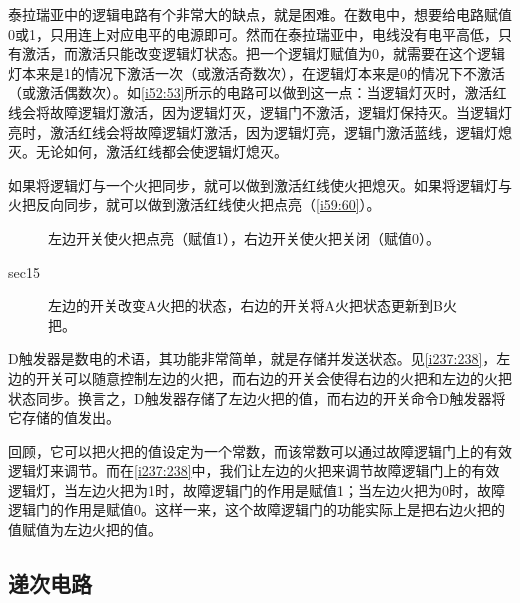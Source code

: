 泰拉瑞亚中的逻辑电路有个非常大的缺点，就是困难。在数电中，想要给电路赋值0或1，只用连上对应电平的电源即可。然而在泰拉瑞亚中，电线没有电平高低，只有激活，而激活只能改变逻辑灯状态。把一个逻辑灯赋值为0，就需要在这个逻辑灯本来是1的情况下激活一次（或激活奇数次），在逻辑灯本来是0的情况下不激活（或激活偶数次）。如\autoref{i52:53}所示的电路可以做到这一点：当逻辑灯灭时，激活红线会将故障逻辑灯激活，因为逻辑灯灭，逻辑门不激活，逻辑灯保持灭。当逻辑灯亮时，激活红线会将故障逻辑灯激活，因为逻辑灯亮，逻辑门激活蓝线，逻辑灯熄灭。无论如何，激活红线都会使逻辑灯熄灭。

\begin{figure}[!ht]
\centering
{}%
%
\caption{}
\label{i52:53}
\end{figure}

如果将逻辑灯与一个火把同步，就可以做到激活红线使火把熄灭。如果将逻辑灯与火把反向同步，就可以做到激活红线使火把点亮（\autoref{i59:60}）。

\begin{figure}[!ht]
\centering
{}%
%
\caption{左边开关使火把点亮（赋值1），右边开关使火把关闭（赋值0）。}
\label{i59:60}
\end{figure}

\begin{example}{}{sec15}

\begin{figure}[H]
\centering
{}%
%
\caption{左边的开关改变A火把的状态，右边的开关将A火把状态更新到B火把。}
\label{i237:238}
\end{figure}

D触发器是数电的术语，其功能非常简单，就是存储并发送状态。见\autoref{i237:238}，左边的开关可以随意控制左边的火把，而右边的开关会使得右边的火把和左边的火把状态同步。换言之，D触发器存储了左边火把的值，而右边的开关命令D触发器将它存储的值发出。

回顾，它可以把火把的值设定为一个常数，而该常数可以通过故障逻辑门上的有效逻辑灯来调节。而在\autoref{i237:238}中，我们让左边的火把来调节故障逻辑门上的有效逻辑灯，当左边火把为1时，故障逻辑门的作用是赋值1；当左边火把为0时，故障逻辑门的作用是赋值0。这样一来，这个故障逻辑门的功能实际上是把右边火把的值赋值为左边火把的值。
\end{example}

\subsection{递次电路}\label{sec35}

